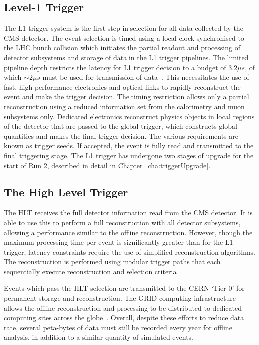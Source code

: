 \subsection{Level-1 Trigger}

The L1 trigger system is the first step in selection for all data collected by the CMS detector. The event selection 
is timed using a local clock synchronised to the LHC bunch collision which initiates the partial readout and processing of 
detector subsystems and storage of data in the L1 trigger pipelines. The limited pipeline depth restricts the latency for L1 trigger decision to a budget of $3.2\mu s$,
of which $\sim2\mu s$ must be used for transmission of data~\cite{daq_performance}. This necessitates the use of fast, high performance electronics
and optical links to rapidly reconstruct the event and make the trigger decision. The timing restriction allows only 
a partial reconstruction using a reduced information set from the calorimetry and muon subsystems only. Dedicated electronics
reconstruct physics objects in local regions of the detector that are passed to the global trigger, which constructs global
quantities and makes the final trigger decision. The various requirements are known as trigger seeds. 
If accepted, the event is fully read and transmitted to the final triggering
stage. The L1 trigger has undergone two stages of upgrade for the start of Run 2, described in detail in Chapter~\ref{cha:triggerUpgrade}.

\subsection{The High Level Trigger}

The HLT receives the full detector information read from the CMS detector. It is able to use this to perform 
a full reconstruction with all detector subsystems, allowing a performance similar to the offline reconstruction. However, 
though the maximum processing time per event is significantly greater than for the L1 trigger, latency constraints 
require the use of simplified reconstruction algorithms. The reconstruction is performed using modular trigger paths
that each sequentially execute reconstruction and selection criteria~\cite{daq_performance}. 

Events which pass the HLT selection are transmitted to the CERN `Tier-0' for permanent storage and reconstruction. 
The GRID computing infrastructure allows the offline reconstruction and processing to be distributed to dedicated 
computing sites across the globe~\cite{grid_tdr}. Overall, despite these efforts to reduce data rate, 
several peta-bytes of data must still be recorded every year for offline analysis, in addition to 
a similar quantity of simulated events.

